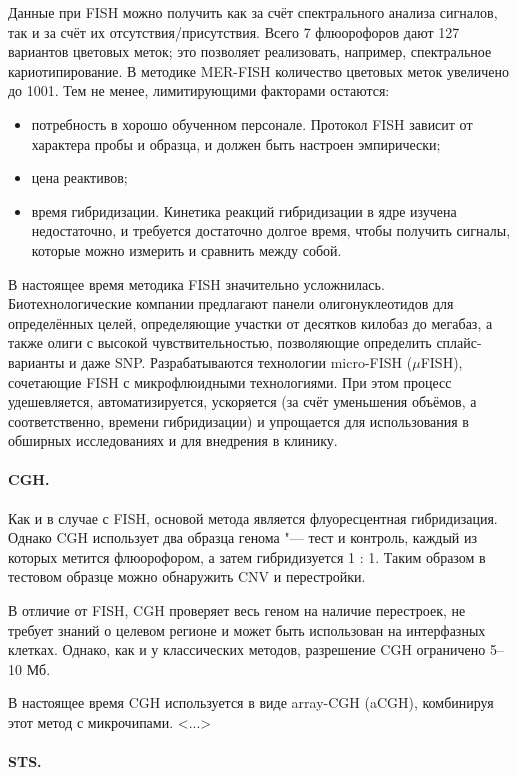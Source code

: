 \documentclass[a4paper,12pt]{article}
\begin{document}
Данные при FISH можно получить как за счёт спектрального анализа сигналов, так и за счёт их отсутствия/присутствия.
Всего 7 флюорофоров дают 127 вариантов цветовых меток; это позволяет реализовать, например, спектральное кариотипирование.
В методике MER-FISH количество цветовых меток увеличено до 1001.
Тем не менее, лимитирующими факторами остаются:

\begin{itemize}
\item потребность в хорошо обученном персонале. 
Протокол FISH зависит от характера пробы и образца, и должен быть настроен эмпирически;
\item цена реактивов;
\item время гибридизации.
Кинетика реакций гибридизации в ядре изучена недостаточно, и требуется достаточно долгое время, чтобы получить сигналы, которые можно измерить и сравнить между собой.
\end{itemize}

В настоящее время методика FISH значительно усложнилась.
Биотехнологические компании предлагают панели олигонуклеотидов для определённых целей, определяющие участки от десятков килобаз до мегабаз, а также олиги с высокой чувствительностью, позволяющие определить сплайс-варианты и даже SNP.
Разрабатываются технологии micro-FISH ($\mu$FISH), сочетающие FISH с микрофлюидными технологиями.
При этом процесс удешевляется, автоматизируется, ускоряется (за счёт уменьшения объёмов, а соответственно, времени гибридизации) и упрощается для использования в обширных исследованиях и для внедрения в клинику\cite{huber}.

\paragraph{CGH.}
Как и в случае с FISH, основой метода является флуоресцентная гибридизация.
Однако CGH использует два образца генома "--- тест и контроль, каждый из которых метится флюорофором, а затем гибридизуется 1 : 1.
Таким образом в тестовом образце можно обнаружить CNV и перестройки.

В отличие от FISH, CGH проверяет весь геном на наличие перестроек, не требует знаний о целевом регионе и может быть использован на интерфазных клетках.
Однако, как и у классических методов, разрешение CGH ограничено 5--10 Мб.

В настоящее время CGH используется в виде array-CGH (aCGH), комбинируя этот метод с микрочипами. <...>
\cite{theisen}

\paragraph{STS.}
\end{document}
